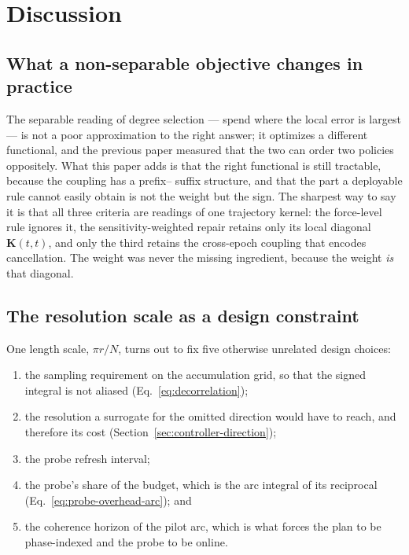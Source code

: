 \section{Discussion}
\label{sec:discussion}

\subsection{What a non-separable objective changes in practice}

 The separable reading of degree selection --- spend
where the local error is largest --- is not a poor approximation to the right
answer; it optimizes a different functional, and the previous paper measured
that the two can order two policies oppositely. What this paper adds is that
the right functional is still tractable, because the coupling has a prefix--
suffix structure, and that the part a deployable rule cannot easily obtain is
not the weight but the sign. The sharpest way to say it is that all three
criteria are readings of one trajectory kernel: the force-level rule ignores
it, the sensitivity-weighted repair retains only its local diagonal
$\mathbf K(t,t)$, and only the third retains the cross-epoch coupling that
encodes cancellation. The weight was never the missing ingredient, because the
weight \emph{is} that diagonal.

\subsection{The resolution scale as a design constraint}

 One length scale, $\pi r/N$, turns out to fix five otherwise
unrelated design choices:

\begin{enumerate}
  \item the sampling requirement on the accumulation grid, so that the signed
    integral is not aliased (Eq.~\eqref{eq:decorrelation});
  \item the resolution a surrogate for the omitted direction would have to
    reach, and therefore its cost (Section~\ref{sec:controller-direction});
  \item the probe refresh interval;
  \item the probe's share of the budget, which is the arc integral of its
    reciprocal (Eq.~\eqref{eq:probe-overhead-arc}); and
  \item the coherence horizon of the pilot arc, which is what forces the plan
    to be phase-indexed and the probe to be online.
\end{enumerate}

